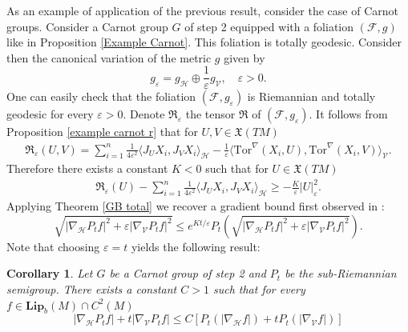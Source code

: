 \documentclass[11pt]{article}
\numberwithin{equation}{section}
\newtheorem{corollary}[theorem]{Corollary}
\newcommand{\Ho}{\mathcal H}
\newcommand{\V}{\mathcal V}
\newcommand{\Tor}{\mathrm{Tor}}
\begin{document}
As an example of application of the previous result, consider the case of Carnot groups.  Consider a Carnot group $G$ of step 2 equipped with a foliation $(\mathcal{F},g)$ like in Proposition \ref{Example Carnot}. This foliation is totally geodesic. 
Consider then the canonical variation of the metric $g$ given by
\[
g_\varepsilon=g_\Ho \oplus \frac{1}{\varepsilon} g_\V, \quad \varepsilon >0.
\]
One can easily check that the foliation $(\mathcal{F},g_\varepsilon)$ is Riemannian and totally geodesic for every $\varepsilon >0$. Denote $\mathfrak{R}_\varepsilon$ the tensor $\mathfrak{R}$ of $(\mathcal{F},g_\varepsilon)$. It follows from Proposition  \ref{example carnot r} that for $U,V \in \mathfrak{X}(TM)$
\begin{align*}
\mathfrak{R}_\varepsilon(U,V)= \sum_{i=1}^n \frac{1}{4\varepsilon^2} \langle J_{U} X_i,J_V X_i\rangle_\Ho-\frac{1}{\varepsilon} \langle \Tor^\nabla(X_i,U),\Tor^\nabla(X_i,V)\rangle_\V.
\end{align*}
Therefore there exists a constant $K <0$ such that for $U\in \mathfrak{X}(TM)$
\begin{align*}
\mathfrak{R}_\varepsilon(U)- \sum_{i=1}^n \frac{1}{4\varepsilon^2} \langle J_{U} X_i,J_V X_i\rangle_\Ho \ge-\frac{K}{\varepsilon} |U|^2_\varepsilon.
\end{align*}
Applying Theorem \ref{GB total} we recover a gradient bound first observed in \cite{MR3601645}:
\[
\sqrt{ |\nabla_\Ho P_t f|^2 +\varepsilon |\nabla_\V P_t f|^2} \le e^{Kt/\varepsilon} P_t \left( \sqrt{ |\nabla_\Ho P_t f|^2 +\varepsilon |\nabla_\V P_t f|^2 } \right).
\]
Note that choosing $\varepsilon=t$ yields the following result:
\begin{corollary}
Let $G$ be a Carnot group of step 2 and $P_t$ be the sub-Riemannian semigroup. There exists a constant $C>1$ such that for every $f \in \mathbf{Lip}_b (M) \cap C^2(M)$
\[
 |\nabla_\Ho P_t f| +t  |\nabla_\V P_t f| \le C \left[P_t  \left(  |\nabla_\Ho f|\right) +t  P_t  \left( |\nabla_\V f| \right)\right]
\]
\end{corollary}



\end{document}
